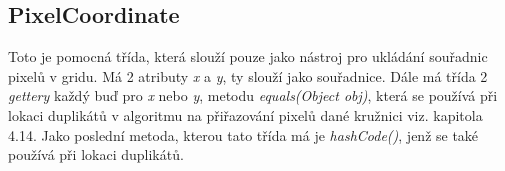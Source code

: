 \subsection{PixelCoordinate}
Toto je pomocná třída, která slouží pouze jako nástroj pro ukládání souřadnic pixelů v gridu. Má 2 atributy\textit{ x} a \textit{y}, ty slouží jako souřadnice. Dále má třída 2 \textit{gettery} každý buď pro \textit{x} nebo \textit{y}, metodu \textit{equals(Object obj)}, která se používá při lokaci duplikátů v algoritmu na přiřazování pixelů dané kružnici viz. kapitola 4.14. Jako poslední metoda, kterou tato třída má je \textit{hashCode()}, jenž se také používá při lokaci duplikátů.